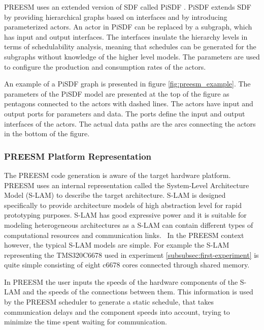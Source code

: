 PREESM uses an extended version of SDF called PiSDF \cite{pelcat2014preesm}. PiSDF extends SDF by providing hierarchical graphs based on interfaces and by introducing parameterized actors. An actor in PiSDF can be replaced by a subgraph, which has input and output interfaces. The interfaces insulate the hierarchy levels in terms of schedulability analysis, meaning that schedules can be generated for the subgraphs without knowledge of the higher level models. The parameters are used to configure the production and consumption rates of the actors.~\cite{desnos2013pimm}

An example of a PiSDF graph is presented in figure \ref{fig:preesm_example}. The parameters of the PiSDF model are presented at the top of the figure as pentagons connected to the actors with dashed lines. The actors have input and output ports for parameters and data. The ports define the input and output interfaces of the actors. The actual data paths are the arcs connecting the actors in the bottom of the figure.

\subsubsection{PREESM Platform Representation}
\label{subsubsec:preesm-hardware}
The PREESM code generation is aware of the target hardware platform. PREESM uses an internal representation called the System-Level Architecture Model (S-LAM) \cite{pelcat2009system} to describe the target architecture. S-LAM is designed specifically to provide architecture models of high abstraction level for rapid prototyping purposes. S-LAM has good expressive power and it is suitable for modeling heterogeneous architectures as a S-LAM can contain different types of computational resources and communication links.~\cite{pelcat2009system} In the PREESM context however, the typical S-LAM models are simple. For example the S-LAM representing the TMS320C6678 used in experiment \ref{subsubsec:first-experiment} is quite simple consisting of eight c6678 cores connected through shared memory.

In PREESM the user inputs the speeds of the hardware components of the S-LAM and the speeds of the connections between them. This information is used by the PREESM scheduler to generate a static schedule, that takes communication delays and the component speeds into account, trying to minimize the time spent waiting for communication.~\cite{pelcat2009system}

